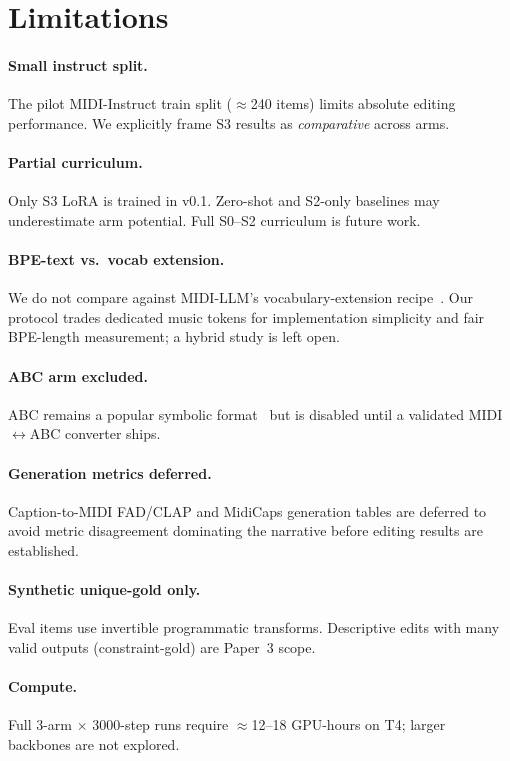 \section{Limitations}

\paragraph{Small instruct split.}
The pilot MIDI-Instruct train split ($\approx$240 items) limits absolute editing performance. We explicitly frame S3 results as \emph{comparative} across arms.

\paragraph{Partial curriculum.}
Only S3 LoRA is trained in v0.1. Zero-shot and S2-only baselines may underestimate arm potential. Full S0--S2 curriculum is future work.

\paragraph{BPE-text vs.\ vocab extension.}
We do not compare against MIDI-LLM's vocabulary-extension recipe~\cite{wu2026midillm}. Our protocol trades dedicated music tokens for implementation simplicity and fair BPE-length measurement; a hybrid study is left open.

\paragraph{ABC arm excluded.}
ABC remains a popular symbolic format~\cite{kumar2026abc,zhao2025abceval} but is disabled until a validated MIDI$\leftrightarrow$ABC converter ships.

\paragraph{Generation metrics deferred.}
Caption-to-MIDI FAD/CLAP and MidiCaps generation tables are deferred to avoid metric disagreement dominating the narrative before editing results are established.

\paragraph{Synthetic unique-gold only.}
Eval items use invertible programmatic transforms. Descriptive edits with many valid outputs (constraint-gold) are Paper~3 scope.

\paragraph{Compute.}
Full 3-arm $\times$ 3000-step runs require $\approx$12--18 GPU-hours on T4; larger backbones are not explored.
